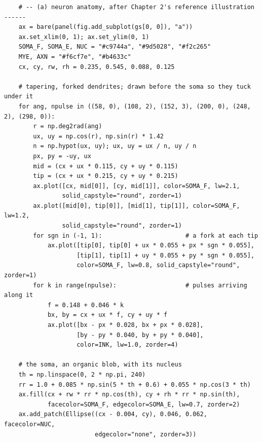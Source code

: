 \documentclass[a4paper,10pt]{article}
\begin{document}
\begin{Verbatim}
    # -- (a) neuron anatomy, after Chapter 2's reference illustration ------
    ax = bare(panel(fig.add_subplot(gs[0, 0]), "a"))
    ax.set_xlim(0, 1); ax.set_ylim(0, 1)
    SOMA_F, SOMA_E, NUC = "#c9744a", "#9d5028", "#f2c265"
    MYE, AXN = "#f6cf7e", "#b4633c"
    cx, cy, rw, rh = 0.235, 0.545, 0.088, 0.125

    # tapering, forked dendrites; drawn before the soma so they tuck under it
    for ang, npulse in ((58, 0), (108, 2), (152, 3), (200, 0), (248, 2), (298, 0)):
        r = np.deg2rad(ang)
        ux, uy = np.cos(r), np.sin(r) * 1.42
        n = np.hypot(ux, uy); ux, uy = ux / n, uy / n
        px, py = -uy, ux
        mid = (cx + ux * 0.115, cy + uy * 0.115)
        tip = (cx + ux * 0.215, cy + uy * 0.215)
        ax.plot([cx, mid[0]], [cy, mid[1]], color=SOMA_F, lw=2.1,
                solid_capstyle="round", zorder=1)
        ax.plot([mid[0], tip[0]], [mid[1], tip[1]], color=SOMA_F, lw=1.2,
                solid_capstyle="round", zorder=1)
        for sgn in (-1, 1):                       # a fork at each tip
            ax.plot([tip[0], tip[0] + ux * 0.055 + px * sgn * 0.055],
                    [tip[1], tip[1] + uy * 0.055 + py * sgn * 0.055],
                    color=SOMA_F, lw=0.8, solid_capstyle="round", zorder=1)
        for k in range(npulse):                   # pulses arriving along it
            f = 0.148 + 0.046 * k
            bx, by = cx + ux * f, cy + uy * f
            ax.plot([bx - px * 0.028, bx + px * 0.028],
                    [by - py * 0.040, by + py * 0.040],
                    color=INK, lw=1.0, zorder=4)

    # the soma, an organic blob, with its nucleus
    th = np.linspace(0, 2 * np.pi, 240)
    rr = 1.0 + 0.085 * np.sin(5 * th + 0.6) + 0.055 * np.cos(3 * th)
    ax.fill(cx + rw * rr * np.cos(th), cy + rh * rr * np.sin(th),
            facecolor=SOMA_F, edgecolor=SOMA_E, lw=0.7, zorder=2)
    ax.add_patch(Ellipse((cx - 0.004, cy), 0.046, 0.062, facecolor=NUC,
                         edgecolor="none", zorder=3))


\end{Verbatim}
\end{document}
